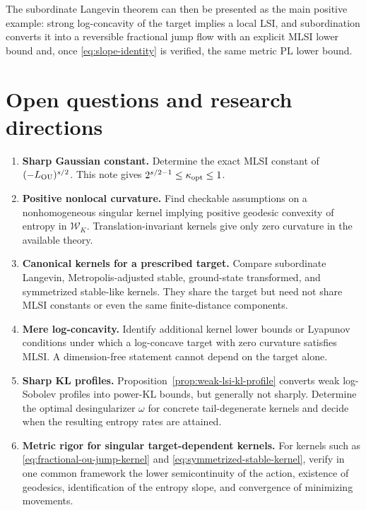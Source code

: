 \documentclass[11pt]{article}
\theoremstyle{definition}
\newcommand{\cW}{\mathcal W}
\begin{document}
The subordinate Langevin theorem can then be presented as the main positive
example: strong log-concavity of the target implies a local LSI, and
subordination converts it into a reversible fractional jump flow with an
explicit MLSI lower bound and, once \eqref{eq:slope-identity} is verified, the
same metric PL lower bound.

\section{Open questions and research directions}

\begin{enumerate}[label=\arabic*.,leftmargin=2.2em]
  \item \textbf{Sharp Gaussian constant.}
  Determine the exact MLSI constant of $(-L_{\rm OU})^{s/2}$.  This note gives
  $2^{s/2-1}\leq\kappa_{\rm opt}\leq1$.
  \item \textbf{Positive nonlocal curvature.}
  Find checkable assumptions on a nonhomogeneous singular kernel implying
  positive geodesic convexity of entropy in $\cW_K$.  Translation-invariant
  kernels give only zero curvature in the available theory.
  \item \textbf{Canonical kernels for a prescribed target.}
  Compare subordinate Langevin, Metropolis-adjusted stable, ground-state
  transformed, and symmetrized stable-like kernels.  They share the target
  but need not share MLSI constants or even the same finite-distance
  components.
  \item \textbf{Mere log-concavity.}
  Identify additional kernel lower bounds or Lyapunov conditions under which
  a log-concave target with zero curvature satisfies MLSI.  A dimension-free
  statement cannot depend on the target alone.
  \item \textbf{Sharp KL profiles.}
  Proposition~\ref{prop:weak-lsi-kl-profile} converts weak log-Sobolev
  profiles into power-KL bounds, but generally not sharply.  Determine the
  optimal desingularizer $\omega$ for concrete tail-degenerate kernels and
  decide when the resulting entropy rates are attained.
  \item \textbf{Metric rigor for singular target-dependent kernels.}
  For kernels such as \eqref{eq:fractional-ou-jump-kernel} and
  \eqref{eq:symmetrized-stable-kernel}, verify in one common framework the
  lower semicontinuity of the action, existence of geodesics, identification
  of the entropy slope, and convergence of minimizing movements.
\end{enumerate}
\end{document}
